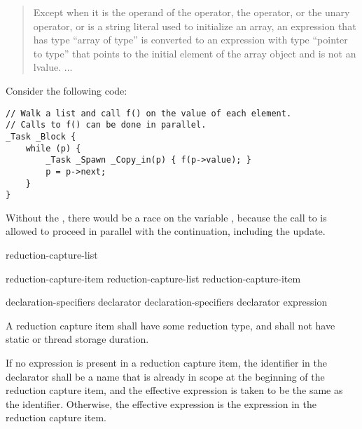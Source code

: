 \begin{quote}
Except when it
is the operand of the  operator,
the  operator,
or the unary \tcode{\&} operator,
or is a string literal used to initialize an array,
an expression that has type ``array of type''
is converted to an expression with type ``pointer to type''
that points to the initial element of the array object
and is not an lvalue. ...
\end{quote}

\begin{example}
Consider the following code:

\begin{verbatim}
// Walk a list and call f() on the value of each element.
// Calls to f() can be done in parallel.
_Task _Block {
    while (p) {
        _Task _Spawn _Copy_in(p) { f(p->value); }
        p = p->next;
    }
}
\end{verbatim}
Without the ,
there would be a race on the variable ,
because the call to 
is allowed to proceed in parallel with the continuation,
including the update.
\end{example}



\begin{bnf}
\br
{} \terminal{(} reduction-capture-list \terminal{)}
\end{bnf}

\begin{bnf}
\br
reduction-capture-item
\br
reduction-capture-list \terminal{,} reduction-capture-item
\end{bnf}

\begin{bnf}
\br
declaration-specifiers declarator
\br
declaration-specifiers declarator \terminal{:} expression
\end{bnf}


\pnum
A reduction capture item
shall have some reduction type,
and shall not have static or thread storage duration.

\pnum
If no expression is present in a reduction capture item,
the identifier in the declarator
shall be a name that is already in scope
at the beginning of the reduction capture item,
and the effective expression is taken to be the same as the identifier.
Otherwise, the effective expression
is the expression in the reduction capture item.

